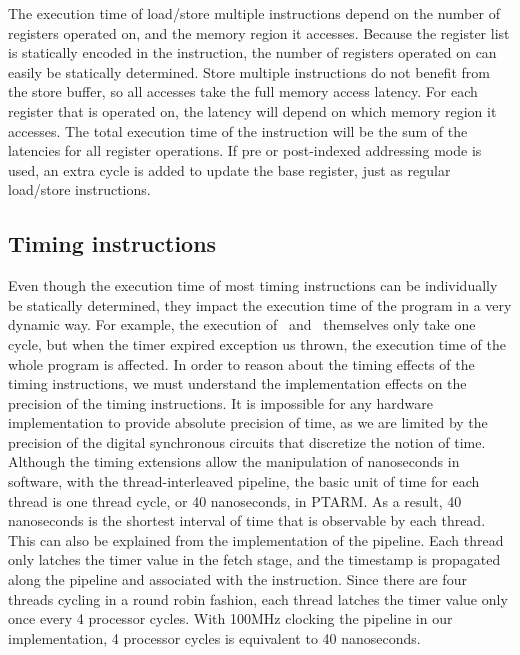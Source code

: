 The execution time of load/store multiple instructions depend on the number of registers operated on, and the memory region it accesses. 
Because the register list is statically encoded in the instruction, the number of registers operated on can easily be statically determined.
Store multiple instructions do not benefit from the store buffer, so all accesses take the full memory access latency.
For each register that is operated on, the latency will depend on which memory region it accesses. 
The total execution time of the instruction will be the sum of the latencies for all register operations. 
If pre or post-indexed addressing mode is used, an extra cycle is added to update the base register, just as regular load/store instructions. 

\subsection{Timing instructions}
Even though the execution time of most timing instructions can be individually be statically determined, they impact the execution time of the program in a very dynamic way.
For example, the execution of \exceptiononexpire\ and \deactivateexception\ themselves only take one cycle, but when the timer expired exception us thrown, the execution time of the whole program is affected. 
In order to reason about the timing effects of the timing instructions, we must understand the implementation effects on the precision of the timing instructions.
It is impossible for any hardware implementation to provide absolute precision of time, as we are limited by the precision of the digital synchronous circuits that discretize the notion of time. 
Although the timing extensions allow the manipulation of nanoseconds in software, with the thread-interleaved pipeline, the basic unit of time for each thread is one thread cycle, or 40 nanoseconds, in PTARM.
As a result, 40 nanoseconds is the shortest interval of time that is observable by each thread.
This can also be explained from the implementation of the pipeline.
Each thread only latches the timer value in the fetch stage, and the timestamp is propagated along the pipeline and associated with the instruction. 
Since there are four threads cycling in a round robin fashion, each thread latches the timer value only once every 4 processor cycles. 
With 100MHz clocking the pipeline in our implementation, 4 processor cycles is  equivalent to 40 nanoseconds. 

